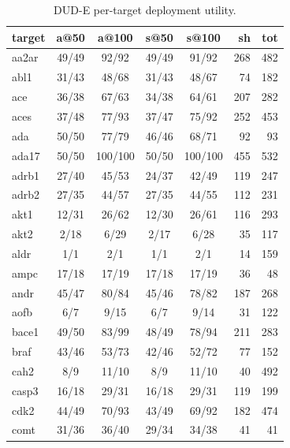 \documentclass[10pt,letterpaper,twocolumn]{article}
\begin{document}
\begin{table}[h]
\centering
\scriptsize
\setlength{\tabcolsep}{3pt}
\caption{DUD-E per-target deployment utility.}
\begin{tabular}{@{}lccccrr@{}}
\toprule
target & a@50 & a@100 & s@50 & s@100 & sh & tot \\
\midrule
aa2ar & 49/49 & 92/92 & 49/49 & 91/92 & 268 & 482 \\
abl1 & 31/43 & 48/68 & 31/43 & 48/67 & 74 & 182 \\
ace & 36/38 & 67/63 & 34/38 & 64/61 & 207 & 282 \\
aces & 37/48 & 77/93 & 37/47 & 75/92 & 252 & 453 \\
ada & 50/50 & 77/79 & 46/46 & 68/71 & 92 & 93 \\
ada17 & 50/50 & 100/100 & 50/50 & 100/100 & 455 & 532 \\
adrb1 & 27/40 & 45/53 & 24/37 & 42/49 & 119 & 247 \\
adrb2 & 27/35 & 44/57 & 27/35 & 44/55 & 112 & 231 \\
akt1 & 12/31 & 26/62 & 12/30 & 26/61 & 116 & 293 \\
akt2 & 2/18 & 6/29 & 2/17 & 6/28 & 35 & 117 \\
aldr & 1/1 & 2/1 & 1/1 & 2/1 & 14 & 159 \\
ampc & 17/18 & 17/19 & 17/18 & 17/19 & 36 & 48 \\
andr & 45/47 & 80/84 & 45/46 & 78/82 & 187 & 268 \\
aofb & 6/7 & 9/15 & 6/7 & 9/14 & 31 & 122 \\
bace1 & 49/50 & 83/99 & 48/49 & 78/94 & 211 & 283 \\
braf & 43/46 & 53/73 & 42/46 & 52/72 & 77 & 152 \\
cah2 & 8/9 & 11/10 & 8/9 & 11/10 & 40 & 492 \\
casp3 & 16/18 & 29/31 & 16/18 & 29/31 & 119 & 199 \\
cdk2 & 44/49 & 70/93 & 43/49 & 69/92 & 182 & 474 \\
comt & 31/36 & 36/40 & 29/34 & 34/38 & 41 & 41 \\
\bottomrule
\end{tabular}
\end{table}
\end{document}
